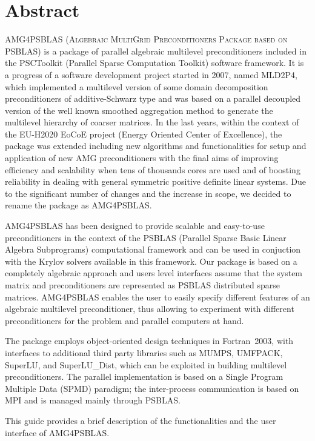 \section*{Abstract}

\textsc{AMG4PSBLAS (Algebraic MultiGrid Preconditioners Package
based on PSBLAS}) is a package of parallel algebraic multilevel preconditioners included in the PSCToolkit (Parallel Sparse Computation Toolkit) software framework.
It is a progress of a software development project started in 2007, named MLD2P4, which implemented a multilevel version of some domain decomposition preconditioners of additive-Schwarz type and was based on a parallel decoupled version of the well known smoothed
aggregation method to generate the multilevel hierarchy of coarser matrices. In the last years, within the context of the EU-H2020 EoCoE project (Energy Oriented Center of Excellence), the package was extended including new algorithms and functionalities for setup and application of new AMG preconditioners with the final aims of improving efficiency and scalability when tens of thousands cores are
used and of boosting reliability in dealing with general symmetric positive definite linear systems. Due to the significant number of changes and the increase in scope, we decided to rename the package as AMG4PSBLAS.

AMG4PSBLAS has been designed to provide scalable and easy-to-use preconditioners
in the context of the PSBLAS (Parallel Sparse Basic Linear Algebra Subprograms)
computational framework and can be used in conjuction with the Krylov solvers
available in this framework.
Our package is based on a completely algebraic approach and users level interfaces
assume that the system matrix and preconditioners are represented as PSBLAS
distributed sparse matrices.
AMG4PSBLAS enables the user to easily specify different
features of an algebraic multilevel preconditioner, thus allowing to experiment
with different preconditioners for the problem and parallel computers at hand.

The package employs object-oriented design techniques in
Fortran~2003, with interfaces to additional third party libraries
such as MUMPS, UMFPACK, SuperLU, and SuperLU\_Dist, which
can be exploited in building multilevel preconditioners. The parallel
implementation is based on a Single Program Multiple Data (SPMD)
paradigm; the inter-process communication is based on MPI and
is managed mainly through PSBLAS.

This guide provides a brief description of the functionalities and
the user interface of AMG4PSBLAS. 